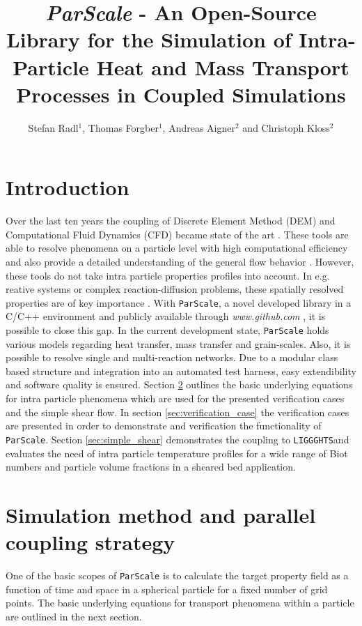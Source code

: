 \documentclass{particles2015}
\title{\textit{ParScale} - An Open-Source Library for the Simulation of Intra-Particle Heat and Mass Transport Processes in Coupled Simulations}
\author{Stefan Radl$^{1}$, Thomas Forgber$^{1}$, Andreas Aigner$^{2}$ and Christoph Kloss$^{2}$}
\begin{document}
\maketitle
\thispagestyle{empty}

\section{Introduction}
\label{sec:introduction}
Over the last ten years the coupling of Discrete Element Method (DEM) and Computational Fluid Dynamics (CFD) became state of the art \cite{Kloss2012}. These tools are able to resolve phenomena on a particle level with high computational efficiency and also provide a detailed understanding of the general flow behavior \cite{Wu2014}. However, these tools do not take intra particle properties profiles into account. In e.g. reative systems or complex reaction-diffusion problems, these spatially resolved properties are of key importance \cite{Dixon2007}. With \texttt{ParScale}, a novel developed library in a C/C++ environment and publicly available through \textit{www.github.com} \cite{ParScale_Public}, it is possible to close this gap. In the current development state, \texttt{ParScale} holds various models regarding heat transfer, mass transfer and grain-scales. Also, it is possible to resolve single and multi-reaction networks. Due to a modular class based structure and integration into an automated test harness, easy extendibility and software quality is ensured. Section \ref{sec:simu_method} outlines the basic underlying equations for intra particle phenomena which are used for the presented verification cases and the simple shear flow. In section \ref{sec:verification_case} the verification cases are presented in order to demonstrate and verification the functionality of \texttt{ParScale}. Section \ref{sec:simple_shear} demonstrates the coupling to \texttt{LIGGGHTS}\textregistered and evaluates the need of intra particle temperature profiles for a wide range of Biot numbers and particle volume fractions in a sheared bed application. 

\section{Simulation method and parallel coupling strategy}
\label{sec:simu_method}
One of the basic scopes of \texttt{ParScale} is to calculate the target property field as a function of time and space in a spherical particle for a fixed number of grid points. The basic underlying equations for transport phenomena within a particle are outlined in the next section.
\end{document}
